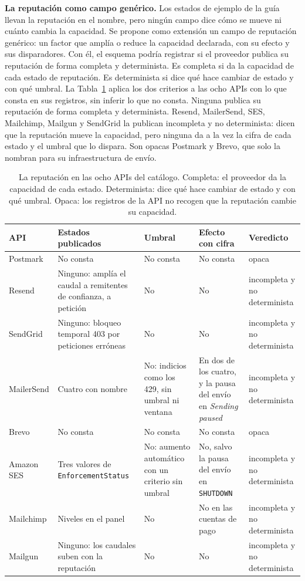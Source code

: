 \textbf{La reputación como campo genérico.} Los estados de ejemplo de la guía llevan la reputación en el nombre, pero ningún campo dice cómo se mueve ni cuánto cambia la capacidad.
Se propone como extensión un campo de reputación genérico: un factor que amplía o reduce la capacidad declarada, con su efecto y sus disparadores.
Con él, el esquema podría registrar si el proveedor publica su reputación de forma completa y determinista.
Es completa si da la capacidad de cada estado de reputación.
Es determinista si dice qué hace cambiar de estado y con qué umbral.
La Tabla~\ref{tab:evolucion:reputacion} aplica los dos criterios a las ocho APIs con lo que consta en sus registros, sin inferir lo que no consta.
Ninguna publica su reputación de forma completa y determinista.
Resend, MailerSend, SES, Mailchimp, Mailgun y SendGrid la publican incompleta y no determinista: dicen que la reputación mueve la capacidad, pero ninguna da a la vez la cifra de cada estado y el umbral que lo dispara.
Son opacas Postmark y Brevo, que solo la nombran para su infraestructura de envío.

\begin{table}[H]
\centering
\small
\begin{tabular}{|p{1.9cm}|p{4.4cm}|p{2.2cm}|p{2.4cm}|p{2.4cm}|}
\hline
\textbf{API} & \textbf{Estados publicados} & \textbf{Umbral} & \textbf{Efecto con cifra} & \textbf{Veredicto} \\
\hline
Postmark & No consta & No consta & No consta & opaca \\
\hline
Resend & Ninguno: amplía el caudal a remitentes de confianza, a petición & No & No & incompleta y no determinista \\
\hline
SendGrid & Ninguno: bloqueo temporal 403 por peticiones erróneas & No & No & incompleta y no determinista \\
\hline
MailerSend & Cuatro con nombre & No: indicios como los 429, sin umbral ni ventana & En dos de los cuatro, y la pausa del envío en \textit{Sending paused} & incompleta y no determinista \\
\hline
Brevo & No consta & No consta & No consta & opaca \\
\hline
Amazon SES & Tres valores de \texttt{EnforcementStatus} & No: aumento automático con un criterio sin umbral & No, salvo la pausa del envío en \texttt{SHUTDOWN} & incompleta y no determinista \\
\hline
Mailchimp & Niveles en el panel & No & No en las cuentas de pago & incompleta y no determinista \\
\hline
Mailgun & Ninguno: los caudales suben con la reputación & No & No & incompleta y no determinista \\
\hline
\end{tabular}
\caption{La reputación en las ocho APIs del catálogo. Completa: el proveedor da la capacidad de cada estado. Determinista: dice qué hace cambiar de estado y con qué umbral. Opaca: los registros de la API no recogen que la reputación cambie su capacidad.}
\label{tab:evolucion:reputacion}
\end{table}

